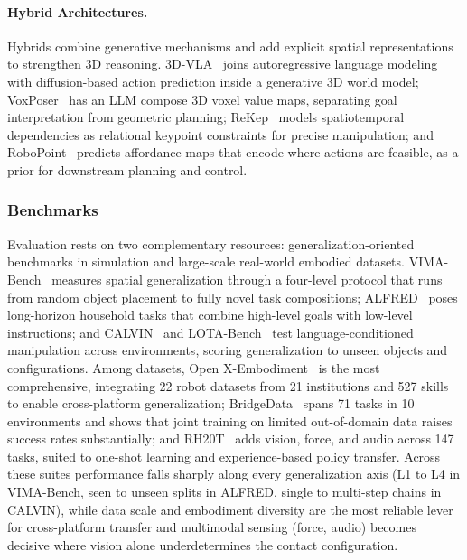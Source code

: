 
\paragraph{Hybrid Architectures.}
Hybrids combine generative mechanisms and add explicit spatial representations to strengthen 3D reasoning.
3D-VLA~\cite{zhen20243d} joins autoregressive language modeling with diffusion-based action prediction inside a generative 3D world model; VoxPoser~\cite{huang2023voxposer} has an LLM compose 3D voxel value maps, separating goal interpretation from geometric planning; ReKep~\cite{huang2024rekep} models spatiotemporal dependencies as relational keypoint constraints for precise manipulation; and RoboPoint~\cite{yuan2024robopoint} predicts affordance maps that encode where actions are feasible, as a prior for downstream planning and control.


\subsubsection{Benchmarks}
Evaluation rests on two complementary resources: generalization-oriented benchmarks in simulation and large-scale real-world embodied datasets.
VIMA-Bench~\cite{jiang2023vima} measures spatial generalization through a four-level protocol that runs from random object placement to fully novel task compositions; ALFRED~\cite{shridhar2020alfred} poses long-horizon household tasks that combine high-level goals with low-level instructions; and CALVIN~\cite{mees2022calvin} and LOTA-Bench~\cite{choi2024lota} test language-conditioned manipulation across environments, scoring generalization to unseen objects and configurations.
Among datasets, Open X-Embodiment~\cite{o2024open} is the most comprehensive, integrating 22 robot datasets from 21 institutions and 527 skills to enable cross-platform generalization; BridgeData~\cite{ebert2021bridge} spans 71 tasks in 10 environments and shows that joint training on limited out-of-domain data raises success rates substantially; and RH20T~\cite{fang2024rh20t} adds vision, force, and audio across 147 tasks, suited to one-shot learning and experience-based policy transfer.
Across these suites performance falls sharply along every generalization axis (L1 to L4 in VIMA-Bench, seen to unseen splits in ALFRED, single to multi-step chains in CALVIN), while data scale and embodiment diversity are the most reliable lever for cross-platform transfer and multimodal sensing (force, audio) becomes decisive where vision alone underdetermines the contact configuration.



